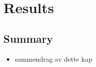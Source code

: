 \chapter{Results}
\label{chapter:results}





\section{Summary}
\label{sect:res:summary}
\begin{itemize}
  \item sammendrag av dette kap
\end{itemize}
